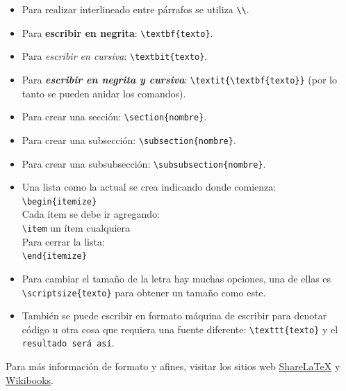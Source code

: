 \documentclass[11pt,]{article}
\begin{document}
\begin{itemize}
\item Para realizar interlineado entre párrafos se utiliza \verb!\\!.
\item Para \textbf{escribir en negrita}: \verb!\textbf{texto}!.
\item Para \textit{escribir en cursiva}: \verb!\textbit{texto}!.
\item Para \textit{\textbf{escribir en negrita y cursiva}}: \verb!\textit{\textbf{texto}}! (por lo tanto se pueden anidar los comandos).
\item Para crear una sección: \verb!\section{nombre}!.
\item Para crear una subsección: \verb!\subsection{nombre}!.
\item Para crear una subsubsección: \verb!\subsubsection{nombre}!.
\item Una lista como la actual se crea indicando donde comienza:\\
\verb!\begin{itemize}!\\
Cada ítem se debe ir agregando:\\
\verb!\item! un ítem cualquiera\\
Para cerrar la lista:\\
\verb!\end{itemize}!\\
\item Para cambiar el tamaño de la letra hay muchas opciones, una de ellas es \verb!\scriptsize{texto}! para obtener \scriptsize{un tamaño como este}\normalsize{.} %
\item También se puede escribir en formato máquina de escribir para denotar código u otra cosa que requiera una fuente diferente: \verb!\texttt{texto}! y el \texttt{resultado será así}.
\end{itemize}

Para más información de formato y afines, visitar los sitios web \href{https://es.sharelatex.com/learn}{Share\LaTeX} y \href{https://en.wikibooks.org/wiki/LaTeX}{Wikibooks}.\\
\end{document}
